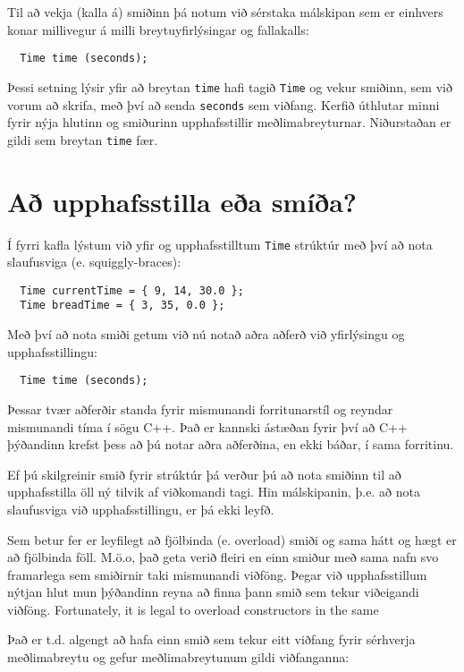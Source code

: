 Til að vekja (kalla á) smiðinn þá notum við sérstaka málskipan sem er einhvers konar millivegur á milli breytuyfirlýsingar og fallakalls:

\begin{verbatim}
  Time time (seconds);
\end{verbatim}
%
Þessi setning lýsir yfir að breytan {\tt time} hafi tagið {\tt Time} og vekur smiðinn, sem við vorum að skrifa, 
með því að senda {\tt seconds} sem viðfang.
Kerfið úthlutar minni fyrir nýja hlutinn og smiðurinn upphafsstillir meðlimabreyturnar.
Niðurstaðan er gildi sem breytan {\tt time} fær.


\section {Að upphafsstilla eða smíða?}

Í fyrri kafla lýstum við yfir og upphafsstilltum {\tt Time} strúktúr með því að nota slaufusviga (e. squiggly-braces):

\begin{verbatim}
  Time currentTime = { 9, 14, 30.0 };
  Time breadTime = { 3, 35, 0.0 };
\end{verbatim}
%
Með því að nota smiði getum við nú notað aðra aðferð við yfirlýsingu og upphafsstillingu:

\begin{verbatim}
  Time time (seconds);
\end{verbatim}
%
Þessar tvær aðferðir standa fyrir mismunandi forritunarstíl og reyndar mismunandi tíma í sögu C++.
Það er kannski ástæðan fyrir því að C++ þýðandinn krefst þess að þú notar aðra aðferðina, en ekki báðar, í sama forritinu.

Ef þú skilgreinir smið fyrir strúktúr þá verður þú að nota smiðinn til að upphafsstilla öll ný tilvik af viðkomandi tagi.
Hin málskipanin, þ.e. að nota slaufusviga við upphafsstillingu, er þá ekki leyfð.

Sem betur fer er leyfilegt að fjölbinda (e. overload) smiði og sama hátt og hægt er að fjölbinda föll.
M.ö.o, það geta verið fleiri en einn smiður með sama nafn svo framarlega sem smiðirnir taki mismunandi viðföng.
Þegar við upphafsstillum nýtjan hlut mun þýðandinn reyna að finna þann smið sem tekur viðeigandi viðföng.
Fortunately, it is legal to overload constructors in the same

Það er t.d. algengt að hafa einn smið sem tekur eitt viðfang fyrir sérhverja meðlimabreytu og gefur meðlimabreytunum gildi viðfanganna:

